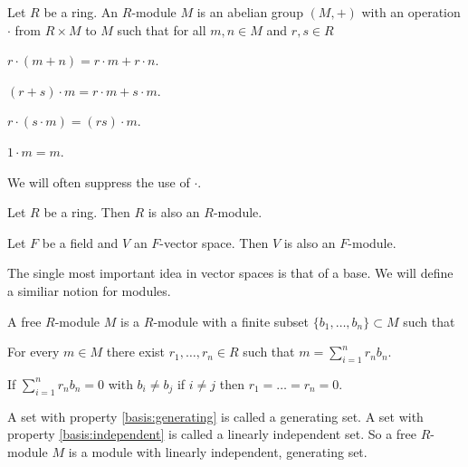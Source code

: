 \begin{definition}
	Let $R$ be a ring. An $R$-module $M$ is an abelian group $(M,+)$ with an
	operation $\cdot$ from $R\times M$ to $M$ such that for all $m,n\in M$
	and $r,s\in R$ 
	\begin{definitionlist}[M]
		\item $r\cdot(m+n) = r\cdot m + r\cdot n$. \label{module:grouphomomorphism}
		\item $(r+s)\cdot m = r\cdot m + s\cdot m$. \label{module:ringhomomorphism1}
		\item $r\cdot(s\cdot m) = (rs)\cdot m$. \label{module:ringhomomorphism2}
		\item $1\cdot m = m$. \label{module:ringhomomorphism3}
	\end{definitionlist}
\end{definition}

\begin{remark}
	We will often suppress the use of $\cdot$.
\end{remark}

\begin{example}\label{example:ringmodule}
	Let $R$ be a ring. Then $R$ is also an $R$-module.
\end{example}

\begin{example}
	Let $F$ be a field and $V$ an $F$-vector space. Then $V$ is also an
	$F$-module.
\end{example} 

The single most important idea in vector spaces is that of a base. We will
define a similiar notion for modules.

\begin{definition}
	A free $R$-module $M$ is a $R$-module with a finite subset
	$\{b_{1},\ldots,b_{n}\}\subset M$ such that 
	\begin{definitionlist}[B]
		\item\label{basis:generating} For every $m\in M$ there exist 
		$r_{1},\ldots,r_{n}\in R$ such that $m=\sum_{i=1}^{n}
		r_{n}b_{n}$.
		
		\item\label{basis:independent} If $\sum_{i=1}^{n} r_{n}b_{n} =
		0$ with $b_{i}\not=b_{j}$ if $i\not=j$ then
		$r_{1}=\ldots=r_{n}=0$. 
	\end{definitionlist}
	A set with property \ref{basis:generating} is called a generating set. A
	set with property \ref{basis:independent} is called a linearly
	independent set. So a free $R$-module $M$ is a module with linearly
	independent, generating set. 	
\end{definition}

